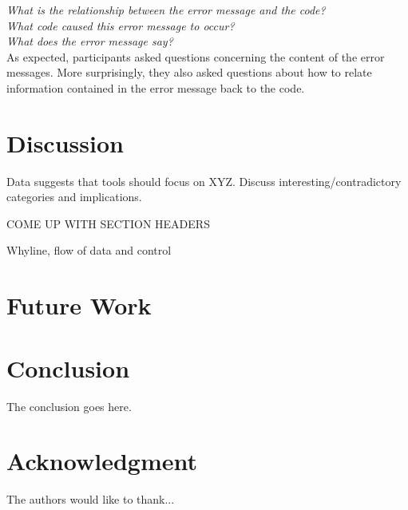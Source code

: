 \documentclass[conference]{IEEEtran}
\begin{document}
\noindent\emph{What is the relationship between the error message and the code?} \\
\emph{What code caused this error message to occur?} \\
\emph{What does the error message say?} \\

As expected, participants asked questions concerning the content of the error messages. 
More surprisingly, they also asked questions about how to relate information contained in the error message back to the code. 

\section{Discussion}
\label{sec:disc}
Data suggests that tools should focus on XYZ. Discuss interesting/contradictory categories and implications.

COME UP WITH SECTION HEADERS

Whyline, flow of data and control

\section{Future Work}
\label{sec:fw}

\section{Conclusion}
\label{sec:concl}
The conclusion goes here.






\section*{Acknowledgment}


The authors would like to thank...




%




\end{document}
